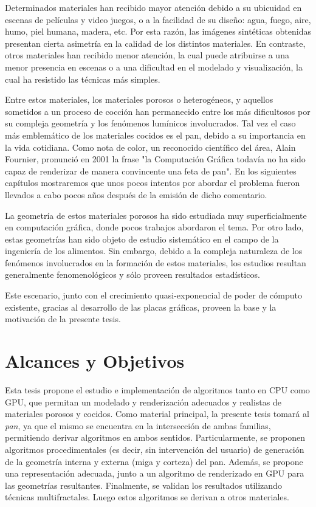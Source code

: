 Determinados materiales han recibido mayor atención debido a su ubicuidad en escenas de películas y video juegos, o a la facilidad de su diseño: agua, fuego, aire, humo, piel humana, madera, etc.
Por esta razón, las imágenes sintéticas obtenidas presentan cierta asimetría en la calidad de los distintos materiales.
En contraste, otros materiales han recibido menor atención, la cual puede atribuirse a una menor presencia en escenas o a una dificultad en el modelado y visualización, la cual ha resistido las técnicas más simples.

Entre estos materiales, los materiales porosos o heterogéneos, y aquellos sometidos a un proceso de cocción han permanecido entre los más dificultosos por su compleja geometría y los fenómenos lumínicos involucrados.
Tal vez el caso más emblemático de los materiales cocidos es el pan, debido a su importancia en la vida cotidiana.
Como nota de color, un reconocido  científico del área, Alain Fournier, pronunció en 2001 la frase "la Computación Gráfica todavía no ha sido capaz de renderizar de manera convincente una feta de pan".
En los siguientes capítulos mostraremos que unos pocos intentos por abordar el problema fueron llevados a cabo pocos años después de la emisión de dicho comentario.

La geometría de estos materiales porosos ha sido estudiada muy superficialmente en computación gráfica, donde pocos trabajos abordaron el tema.
Por otro lado, estas geometrías han sido objeto de estudio sistemático en el campo de la ingeniería de los alimentos.
Sin embargo, debido a la compleja naturaleza de los fenómenos involucrados en la formación de estos materiales, los estudios resultan generalmente fenomenológicos y sólo proveen resultados estadísticos.

Este escenario, junto con el crecimiento quasi-exponencial de poder de cómputo existente, gracias al desarrollo de las placas gráficas, proveen la base y la motivación de la presente tesis.

\section{Alcances y Objetivos}
Esta tesis propone el estudio e implementación de algoritmos tanto en CPU como GPU, que permitan un modelado y renderización adecuados y realistas de materiales porosos y cocidos.
Como material principal, la presente tesis tomará al {\em pan}, ya que el mismo se encuentra en la intersección de ambas familias, permitiendo derivar algoritmos en ambos sentidos.
Particularmente, se proponen algoritmos procedimentales (es decir, sin intervención del usuario) de generación de la geometría interna y externa (miga y corteza) del pan.
Además, se propone una representación adecuada, junto a un algoritmo de renderizado en GPU para las geometrías resultantes.
Finalmente, se validan los resultados utilizando técnicas multifractales.
Luego estos algoritmos se derivan a otros materiales.

